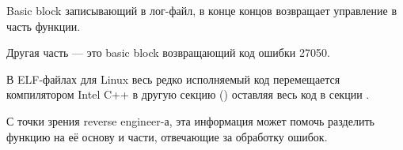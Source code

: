 Basic block записывающий в лог-файл, в конце концов возвращает управление в  часть
функции.

Другая  часть --- это \gls{basic block} возвращающий код ошибки 27050.

В ELF-файлах для Linux весь редко исполняемый код перемещается компилятором Intel C++
в другую секцию () оставляя весь  код в секции .

С точки зрения reverse engineer-а, эта информация может помочь разделить функцию на её основу
и части, отвечающие за обработку ошибок.
